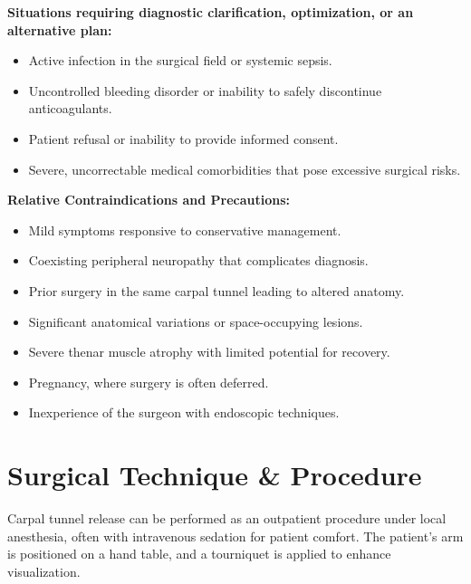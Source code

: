 \textbf{Situations requiring diagnostic clarification, optimization, or an alternative plan:}
\begin{itemize}
  \item Active infection in the surgical field or systemic sepsis.
  \item Uncontrolled bleeding disorder or inability to safely discontinue anticoagulants.
  \item Patient refusal or inability to provide informed consent.
  \item Severe, uncorrectable medical comorbidities that pose excessive surgical risks.
\end{itemize}

\textbf{Relative Contraindications and Precautions:}
\begin{itemize}
  \item Mild symptoms responsive to conservative management.
  \item Coexisting peripheral neuropathy that complicates diagnosis.
  \item Prior surgery in the same carpal tunnel leading to altered anatomy.
  \item Significant anatomical variations or space-occupying lesions.
  \item Severe thenar muscle atrophy with limited potential for recovery.
  \item Pregnancy, where surgery is often deferred.
  \item Inexperience of the surgeon with endoscopic techniques.
\end{itemize}

\section*{Surgical Technique \& Procedure}
Carpal tunnel release can be performed as an outpatient procedure under local anesthesia, often with intravenous sedation for patient comfort. The patient's arm is positioned on a hand table, and a tourniquet is applied to enhance visualization.

